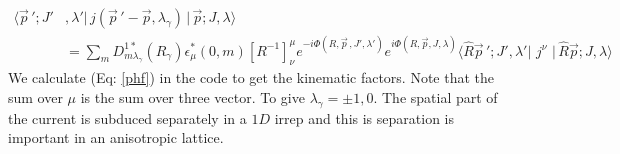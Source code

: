 \documentclass[10pt]{article}
\begin{document}
\begin{align}
\big\langle \vec{p}\,'; J'& ,\lambda'  \big| \, j(\vec{p}\,' - \vec{p},\lambda_{\gamma}) \, \big| \, \vec{p}; J, \lambda  \big\rangle  \\
&= \sum_{m}D^{1*}_{m\lambda_{\gamma}}(R_\gamma)\epsilon^{*}_{\mu}(0, m)  \left[R^{-1}\right]^\mu_\nu    e^{-i \Phi(R, \vec{p}\,, J', \lambda')} e^{i \Phi(R, \vec{p}, J, \lambda)} \big\langle \hat{R}\vec{p}\,'; J' ,\lambda'  \big|\,  \, j^\nu\,  \, \big| \, \hat{R}\vec{p}; J, \lambda  \big\rangle
\label{phf}
\end{align}
We calculate (Eq: \ref{phf}) in the code to get the kinematic factors. Note that the sum over $\mu$ is the sum over three vector. To give $\lambda_{\gamma} = \pm 1, 0$. The spatial part of the current is subduced separately in a $1D$ irrep and this is separation is important in an anisotropic lattice. \par
\end{document}
